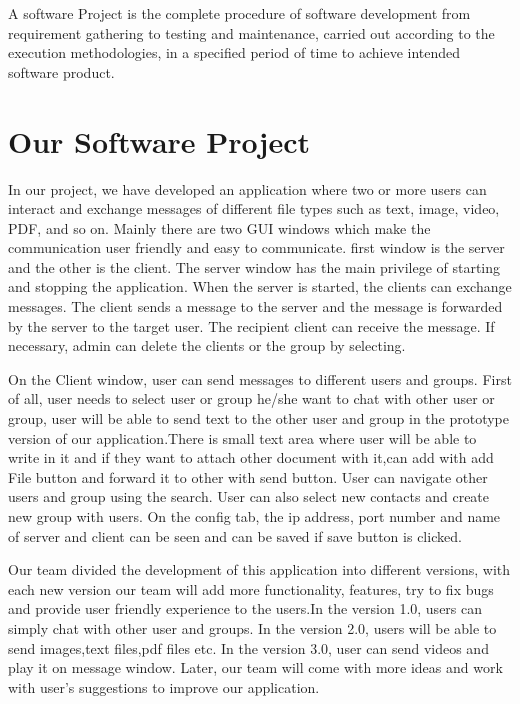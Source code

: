     A software Project is the complete procedure of software development from requirement gathering
    to testing and maintenance, carried out according to the execution methodologies,
    in a specified period of time to achieve intended software product.

   \section{Our Software  Project}\label{sec:our-software--project}
    In our project, we have developed an application where two or more users can interact and
    exchange messages of different file types such as text, image, video, PDF, and so on.
    Mainly there are two GUI windows which make the communication user friendly and easy to
    communicate.
    first window is the server and the other is the client.
    The server window has the main privilege of starting and stopping the application.
    When the server is started, the clients can exchange messages.
    The client sends a message to the server and the message is forwarded by the server to the
    target user.
    The recipient client can receive the message.
    If necessary, admin can delete the clients or the group by selecting.
    \medskip
    
    \noindent
    On the Client window, user can send messages to different users and groups.
    First of all, user needs to select user or group he/she want to chat with other user or group,
    user will be able to send text to the other user and group in the prototype version of our
    application.There is small text area where user will be able to write in it and if they want
    to attach other document with it,can add with add File button and forward it to other with send
    button.
    User can navigate other users and group using the search.
    User can also select new contacts and create new group with users.
    On the config tab, the ip address, port number and name of server and client can be seen and
    can be saved if save button is clicked.
    \medskip
   
    \noindent
    Our team divided the development of this application into different versions, with each new
    version our team will add more functionality, features, try to fix bugs and provide user
    friendly experience to the users.In the version 1.0, users can simply chat with other user
    and groups.
    In the version 2.0, users will be able to send images,text files,pdf files etc.
    In the version 3.0, user can send videos and play it on message window.
    Later, our team will come with more ideas and work with user's suggestions to improve our
    application.
    \medskip


